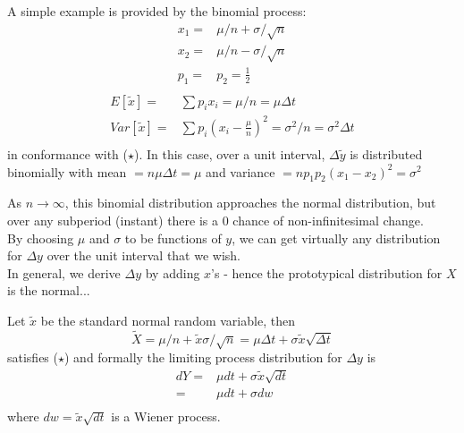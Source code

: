 \documentclass[
14pt,notheorems,hyperref={pdfauthor=whatever}
]{beamer}
\begin{document}
\begin{frame}
A simple example is provided by the binomial process:\\
\begin{align*}
    x_1 =& \mu/n + \sigma/\sqrt{n}\\
    x_2 =& \mu/n - \sigma/\sqrt{n}\\
    p_1 =& p_2 = \frac{1}{2}\\
\end{align*}
\begin{align*}
    E[\tilde x] =& \sum p_i x_i = \mu / n = \mu \Delta t\\
    Var[\tilde x] =& \sum p_i (x_i-\frac{\mu}{n})^2 = \sigma^2/n = \sigma^2 \Delta t\\
\end{align*}
in conformance with ($\star$). In this case, over a unit interval, $\Delta \tilde y$ is distributed binomially with mean $=n\mu\Delta t = \mu$ and variance $=np_1p_2(x_1-x_2)^2=\sigma^2$\\
\end{frame}

\begin{frame}
As $n\to\infty$, this binomial distribution approaches the normal distribution, but over any subperiod (instant) there is a 0 chance of non-infinitesimal change.\\
\hfill\break
By choosing $\mu$ and $\sigma$ to be functions of $y$, we can get virtually any distribution for $\Delta y$ over the unit interval that we wish.\\
\hfill\break
In general, we derive $\Delta y$ by adding $x$'s - hence the prototypical distribution for $X$ is the normal...\\
\end{frame}

\begin{frame}
Let $\tilde x$ be the standard normal random variable, then\\
\[\tilde X = \mu/n + \tilde x \sigma/\sqrt{n} = \mu \Delta t + \sigma\tilde x \sqrt{\Delta t}\]
satisfies ($\star$) and formally the limiting process distribution for $\Delta y$ is\\
\begin{align*}
    dY =& \mu dt + \sigma \tilde x \sqrt{dt}\\
    =& \mu dt + \sigma dw\\
\end{align*}
where $dw=\tilde x \sqrt{dt}$ is a Wiener process.\\
\end{frame}
\end{document}
